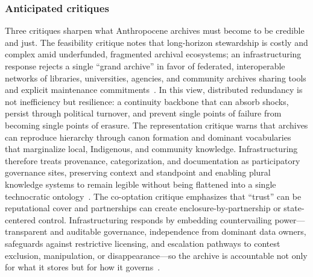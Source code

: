 \documentclass[acmsmall,screen]{acmart}
\begin{document}
\subsubsection*{Anticipated critiques}
Three critiques sharpen what Anthropocene archives must become to be credible and just. The feasibility critique notes that long-horizon stewardship is costly and complex amid underfunded, fragmented archival ecosystems; an infrastructuring response rejects a single “grand archive” in favor of federated, interoperable networks of libraries, universities, agencies, and community archives sharing tools and explicit maintenance commitments~\cite{tanseyArchivalAdaptationClimate2015,mazurczykAmericanArchivesClimate2018,robinsonComeHellHigh2021}. In this view, distributed redundancy is not inefficiency but resilience: a continuity backbone that can absorb shocks, persist through political turnover, and prevent single points of failure from becoming single points of erasure. The representation critique warns that archives can reproduce hierarchy through canon formation and dominant vocabularies that marginalize local, Indigenous, and community knowledge. Infrastructuring therefore treats provenance, categorization, and documentation as participatory governance sites, preserving context and standpoint and enabling plural knowledge systems to remain legible without being flattened into a single technocratic ontology~\cite{woodMobilizingRecordsReframing2014,carbajalCriticalDigitalArchives2021a}. The co-optation critique emphasizes that “trust” can be reputational cover and partnerships can create enclosure-by-partnership or state-centered control. Infrastructuring responds by embedding countervailing power—transparent and auditable governance, independence from dominant data owners, safeguards against restrictive licensing, and escalation pathways to contest exclusion, manipulation, or disappearance—so the archive is accountable not only for what it stores but for how it governs~\cite{blankeReassemblingDigitalArchives2024,viebachEvidenceUseArchives2022}.
\end{document}
